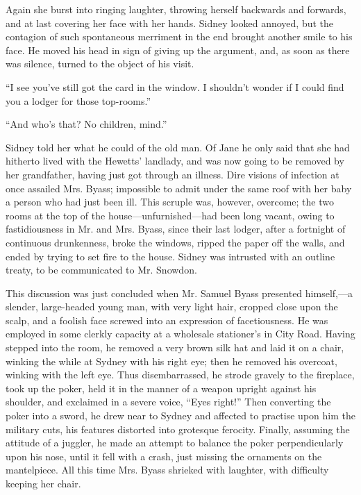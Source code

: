 Again she burst into ringing laughter, throwing herself backwards and
forwards, and {}at last covering her face with her hands. Sidney looked
annoyed, but the contagion of such spontaneous merriment in the end
brought another smile to his face. He moved his head in sign of giving
up the argument, and, as soon as there was silence, turned to the object
of his visit.

``I see you've still got the card in the window. I shouldn't wonder if I
could find you a lodger for those top-rooms.''

``And who's that? No children, mind.''

Sidney told her what he could of the old man. Of Jane he only said that
she had hitherto lived with the Hewetts' landlady, and was now going to
be removed by her grandfather, having just got through an illness. Dire
visions of infection at once assailed Mrs. Byass; impossible to admit
under the same roof with her baby a person who had just been ill. This
scruple was, however, overcome; the two rooms at the top of the
house---unfurnished---had been long vacant, owing to fastidiousness in
Mr. and Mrs. Byass, since their last lodger, after a fortnight of
{}continuous drunkenness, broke the windows, ripped the paper off the
walls, and ended by trying to set fire to the house. Sidney was
intrusted with an outline treaty, to be communicated to Mr. Snowdon.

This discussion was just concluded when Mr. Samuel Byass presented
himself,---a slender, large-headed young man, with very light hair,
cropped close upon the scalp, and a foolish face screwed into an
expression of facetiousness. He was employed in some clerkly capacity at
a wholesale stationer's in City Road. Having stepped into the room, he
removed a very brown silk hat and laid it on a chair, winking the while
at Sydney with his right eye; then he removed his overcoat, winking with
the left eye. Thus disembarrassed, he strode gravely to the fireplace,
took up the poker, held it in the manner of a weapon upright against his
shoulder, and exclaimed in a severe voice, ``Eyes right!'' Then
converting the poker into a sword, he drew near to Sydney and affected
to practise upon him the military cuts, his features {}distorted into
grotesque ferocity. Finally, assuming the attitude of a juggler, he made
an attempt to balance the poker perpendicularly upon his nose, until it
fell with a crash, just missing the ornaments on the mantelpiece. All
this time Mrs. Byass shrieked with laughter, with difficulty keeping her
chair.

